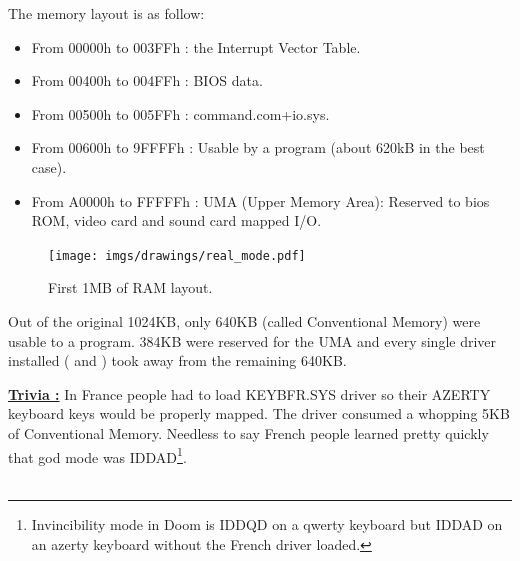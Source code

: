 \documentclass[book.tex]{subfiles}
\begin{document}
  \bigskip
The memory layout is as follow:\\
\begin{itemize}
\item From 00000h to 003FFh : the Interrupt Vector Table.
\item From 00400h to 004FFh : BIOS data.
\item From 00500h to 005FFh : command.com+io.sys.
\item From 00600h to 9FFFFh : Usable by a program (about 620kB in the best case). 
\item From A0000h to FFFFFh : UMA (Upper Memory Area): Reserved to bios ROM, video card and sound card mapped I/O.
\end{itemize}

\begin{figure}[H]
\centering
\texttt{[image: imgs/drawings/real\_mode.pdf]}

\caption{First 1MB of RAM layout.}
\label{fig:fp_internals}
\end{figure}


Out of the original 1024KB, only 640KB (called Conventional Memory) were usable to a program. 384KB were reserved for the UMA and every single driver installed ( and )  took away from the remaining 640KB.

\bigskip

\textbf{\underline{Trivia :}}  In France people had to load KEYBFR.SYS driver so their AZERTY keyboard keys would be properly mapped. The driver consumed a whopping 5KB of Conventional Memory. Needless to say French people learned pretty quickly that god mode was IDDAD\footnote{Invincibility mode in Doom is IDDQD on a qwerty keyboard but IDDAD on an azerty keyboard without the French driver loaded.}.\\
\\
\end{document}
